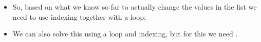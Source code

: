 \documentclass[letterpaper,10pt,english]{sphinxmanual}
\begin{document}
\begin{itemize}
\begin{sphinxVerbatim}[commandchars=\\\{\}]
 
       
          
\end{sphinxVerbatim}

\item {} 
So, based on what we know so far to actually change the values in
the list we need to use indexing together with a  loop:

\begin{sphinxVerbatim}[commandchars=\\\{\}]
 
      
       
        \PYG{p}{[}\PYG{p}{]}  \PYG{p}{[}\PYG{p}{]}
          
\end{sphinxVerbatim}

\item {} 
We can also solve this using a  loop and indexing, but for
this we need .

\end{itemize}
\end{document}
